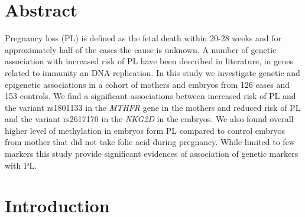 \documentclass[10pt,letterpaper]{article}
\begin{document}
\section*{Abstract}
Pregnancy loss (PL) is defined as the fetal death within 20-28 weeks and for approximately half of the cases the cause is unknown. A number of genetic association with increased risk of PL have been described in literature, in genes related to immunity an DNA replication. In this study we investigate genetic and epigenetic associations in a cohort of mothers and embryos from 126 cases and 153 controls. We find a significant associations between increased risk of PL and the variant rs1801133 in the \textit{MTHFR} gene in the mothers and reduced risk of PL and the variant  rs2617170 in the \textit{NKG2D} in the embryos. We also found overall higher level of methylation in embryos form PL compared to control embryos from mother that did not take folic acid during pregnancy. While limited to few markers this study provide significant evidences of association of genetic markers with PL.




\linenumbers

\section*{Introduction}
\end{document}
